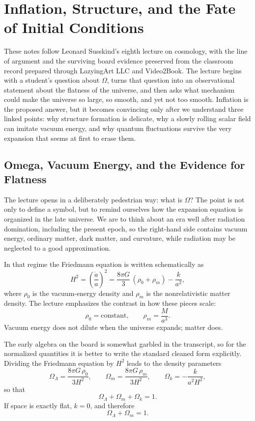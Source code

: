 \chapter{Inflation, Structure, and the Fate of Initial Conditions}

These notes follow Leonard Susskind's eighth lecture on cosmology, with the line of argument and the surviving board evidence preserved from the classroom record prepared through LazyingArt LLC and Video2Book. The lecture begins with a student's question about \(\Omega\), turns that question into an observational statement about the flatness of the universe, and then asks what mechanism could make the universe so large, so smooth, and yet not too smooth. Inflation is the proposed answer, but it becomes convincing only after we understand three linked points: why structure formation is delicate, why a slowly rolling scalar field can imitate vacuum energy, and why quantum fluctuations survive the very expansion that seems at first to erase them.

\section{Omega, Vacuum Energy, and the Evidence for Flatness}

The lecture opens in a deliberately pedestrian way: what is \(\Omega\)? The point is not only to define a symbol, but to remind ourselves how the expansion equation is organized in the late universe. We are to think about an era well after radiation domination, including the present epoch, so the right-hand side contains vacuum energy, ordinary matter, dark matter, and curvature, while radiation may be neglected to a good approximation.

In that regime the Friedmann equation is written schematically as
\begin{equation}
H^2=\left(\frac{\dot a}{a}\right)^2=\frac{8\pi G}{3}\,(\rho_0+\rho_m)-\frac{k}{a^2},
\end{equation}
where \(\rho_0\) is the vacuum-energy density and \(\rho_m\) is the nonrelativistic matter density. The lecture emphasizes the contrast in how these pieces scale:
\begin{equation}
\rho_0=\text{constant},
\qquad
\rho_m=\frac{M}{a^3}.
\end{equation}
Vacuum energy does not dilute when the universe expands; matter does.

The early algebra on the board is somewhat garbled in the transcript, so for the normalized quantities it is better to write the standard cleaned form explicitly. Dividing the Friedmann equation by \(H^2\) leads to the density parameters
\begin{equation}
\Omega_\Lambda=\frac{8\pi G\,\rho_0}{3H^2},
\qquad
\Omega_m=\frac{8\pi G\,\rho_m}{3H^2},
\qquad
\Omega_k=-\frac{k}{a^2H^2},
\end{equation}
so that
\begin{equation}
\Omega_\Lambda+\Omega_m+\Omega_k=1.
\end{equation}
If space is exactly flat, \(k=0\), and therefore
\begin{equation}
\Omega_\Lambda+\Omega_m=1.
\end{equation}

